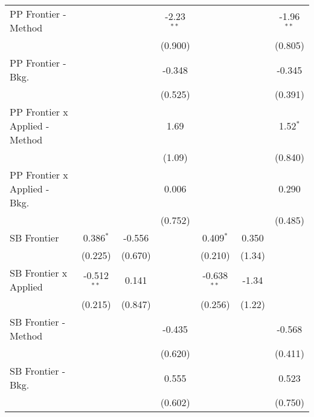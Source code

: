 \begin{tabular}{lcccccc}
   PP Frontier - Method           &               &               & -2.23$^{**}$ &               &               & -1.96$^{**}$\\   
                                  &               &               & (0.900)      &               &               & (0.805)\\   
   PP Frontier - Bkg.             &               &               & -0.348       &               &               & -0.345\\   
                                  &               &               & (0.525)      &               &               & (0.391)\\   
   PP Frontier x Applied - Method &               &               & 1.69         &               &               & 1.52$^{*}$\\   
                                  &               &               & (1.09)       &               &               & (0.840)\\   
   PP Frontier x Applied - Bkg.   &               &               & 0.006        &               &               & 0.290\\   
                                  &               &               & (0.752)      &               &               & (0.485)\\   
   SB Frontier                    & 0.386$^{*}$   & -0.556        &              & 0.409$^{*}$   & 0.350         &   \\   
                                  & (0.225)       & (0.670)       &              & (0.210)       & (1.34)        &   \\   
   SB Frontier x Applied          & -0.512$^{**}$ & 0.141         &              & -0.638$^{**}$ & -1.34         &   \\   
                                  & (0.215)       & (0.847)       &              & (0.256)       & (1.22)        &   \\   
   SB Frontier - Method           &               &               & -0.435       &               &               & -0.568\\   
                                  &               &               & (0.620)      &               &               & (0.411)\\   
   SB Frontier - Bkg.             &               &               & 0.555        &               &               & 0.523\\   
                                  &               &               & (0.602)      &               &               & (0.750)\\   

\end{tabular}
